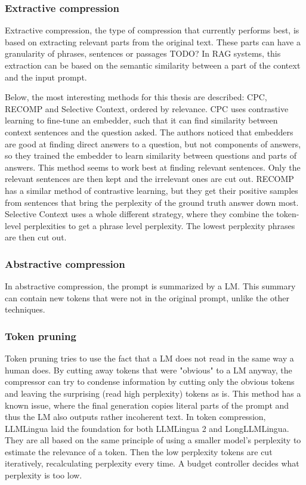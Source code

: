 \subsubsection{Extractive compression}
Extractive compression, the type of compression that currently performs best, is based on extracting relevant parts from the original text. These parts can have a granularity of phrases, sentences or passages TODO? In RAG systems, this extraction can be based on the semantic similarity between a part of the context and the input prompt. 

Below, the most interesting methods for this thesis are described: CPC, RECOMP and Selective Context, ordered by relevance. CPC uses contrastive learning to fine-tune an embedder, such that it can find similarity between context sentences and the question asked. The authors noticed that embedders are good at finding direct answers to a question, but not components of answers, so they trained the embedder to learn similarity between questions and parts of answers. This method seems to work best at finding relevant sentences. Only the relevant sentences are then kept and the irrelevant ones are cut out. RECOMP has a similar method of contrastive learning, but they get their positive samples from sentences that bring the perplexity of the ground truth answer down most. Selective Context uses a whole different strategy, where they combine the token-level perplexities to get a phrase level perplexity. The lowest perplexity phrases are then cut out.
\subsubsection{Abstractive compression}
In abstractive compression, the prompt is summarized by a LM. This summary can contain new tokens that were not in the original prompt, unlike the other techniques.
\subsubsection{Token pruning}
Token pruning tries to use the fact that a LM does not read in the same way a human does. By cutting away tokens that were "obvious" to a LM anyway, the compressor can try to condense information by cutting only the obvious tokens and leaving the surprising (read high perplexity) tokens as is. This method has a known issue, where the final generation copies literal parts of the prompt and thus the LM also outputs rather incoherent text. In token compression, LLMLingua laid the foundation for both LLMLingua 2 and LongLLMLingua. They are all based on the same principle of using a smaller model's perplexity to estimate the relevance of a token. Then the low perplexity tokens are cut iteratively, recalculating perplexity every time. A budget controller decides what perplexity is too low.

